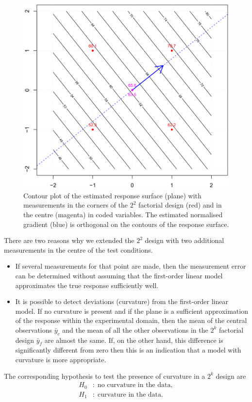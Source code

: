 \begin{figure}[H]
  \centering
  \includegraphics[width=.7\linewidth]{Pics/15.1.2.png}
  \caption{Contour plot of the estimated response surface (plane) with measurements in the corners of the $2^2$ factorial design (red) and in the centre (magenta) in coded variables. The estimated normalised gradient (blue) is orthogonal on the contours of the response surface.}
\end{figure}

There are two reasons why we extended the $2^2$ design with two additional measurements in the centre of the test conditions.
\begin{itemize}
  \item If several measurements for that point are made, then the measurement error can be determined without assuming that the first-order linear model approximates the true response sufficiently well.
  \item It is possible to detect deviations (curvature) from the first-order linear model. If no curvature is present and if the plane is a sufficient approximation of the response within the experimental domain, then the mean of the central observations $\bar{y}_c$ and the mean of all the other observations in the $2^k$ factorial design $\bar{y}_f$ are almost the same. If, on the other hand, this difference is significantly different from zero then this is an indication that a model with curvature is more appropriate.\\
\end{itemize}

The corresponding hypothesis to test the presence of curvature in a $2^k$ design are
\begin{equation}
  \begin{split}
    H_0 &: \;\text{no curvature in the data},\\
    H_1 &: \;\text{curvature in the data}.
  \end{split}
\end{equation}


